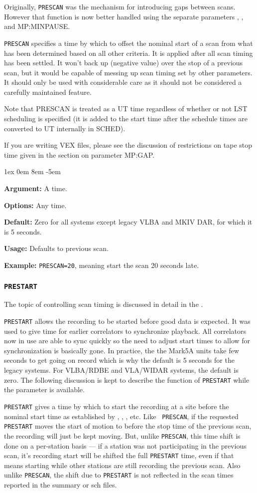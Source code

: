 \documentclass{report}
\newcommand{\sched}{{\sc SCHED}}
\newcommand{\rcwbox}[5]{
  \begin{list}{}{\parsep 1ex  \itemsep 0em
                 \leftmargin 8em  \itemindent -5em }
    \item {\bf Argument:} #1
    \item {\bf Options:}  #2
    \item {\bf Default:}  #3
    \item {\bf Usage:}    #4
    \item {\bf Example:}  #5
  \end{list}
}
\begin{document}
Originally, {\tt PRESCAN} was the mechanism for introducing gaps
between scans.  However that function is now better handled using the
separate parameters , , and  {MP:MINPAUSE}.

{\tt PRESCAN} specifies a time by which to offset the nominal start 
of a scan from what has been determined based on all other criteria.
It is applied after all scan timing has been settled.  It won't 
back up (negative value) over the stop of a previous scan, but it
would be capable of messing up scan timing set by other parameters.
It should only be used with considerable care as it should not be
considered a carefully maintained feature.

Note that PRESCAN is treated as a UT time regardless of whether or
not LST scheduling is specified (it is added to the start time after
the schedule times are converted to UT internally in \sched).

If you are writing VEX files, please see the discussion of restrictions
on tape stop time given in the section on parameter 
{MP:GAP}.


\rcwbox
{A time.}
{Any time.}
{Zero for all systems except legacy VLBA and MKIV DAR, for which it is
5 seconds.}
{Defaults to previous scan.}
{{\tt PRESCAN=20}, meaning start the scan 20 seconds late.}

\subsubsection{\label{MP:PRESTART}{\tt PRESTART}}

The topic of controlling scan timing is discussed in detail in
the .

{\tt PRESTART} allows the recording to be started before good data is
expected.  It was used to give time for earlier correlators to
synchronize playback.  All correlators now in use are able to sync
quickly so the need to adjust start times to allow for synchronization
is basically gone.  In practice, the the Mark5A units take few seconds to get
going on record which is why the default is 5 seconds for the legacy systems.
For VLBA/RDBE and VLA/WIDAR systems, the default is zero.  The following
discussion is kept to describe the function of {\tt PRESTART} while
the parameter is available.

{\tt PRESTART} gives a time by which to start the recording at a
site before the nominal start time as established by , , ,  etc.  Like {\tt
PRESCAN}, if the requested {\tt PRESTART} moves the start of motion to
before the stop time of the previous scan, the recording will just be kept
moving.  But, unlike {\tt PRESCAN}, this time shift is done on a
per-station basis --- if a station was not participating in the
previous scan, it's recording start will be shifted the full
{\tt PRESTART} time, even if that means starting while other stations
are still recording the previous scan.  Also unlike {\tt PRESCAN},
the shift due to {\tt PRESTART} is not reflected in the scan
times reported in the summary or sch files.
\end{document}
